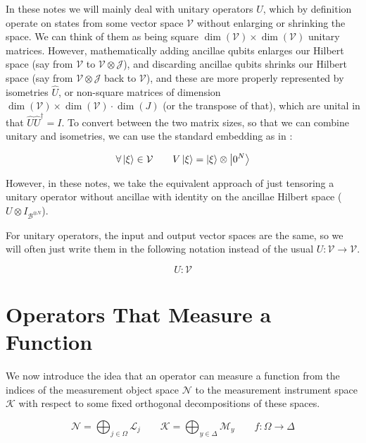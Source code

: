 In these notes we will mainly deal with unitary operators $U$, which by
definition operate on
states from some vector space $\mathcal{V}$
without enlarging or shrinking the space.
We can think of them as being square
$\dim(\mathcal{V}) \times \dim(\mathcal{V})$
unitary matrices.
However, mathematically adding ancillae qubits enlarges our Hilbert space
(say from $\mathcal{V}$ to $\mathcal{V}\otimes \mathcal{J}$),
and discarding ancillae qubits shrinks our Hilbert space
(say from $\mathcal{V}\otimes \mathcal{J}$ back to $\mathcal{V}$),
and these are more properly represented by isometries $\hat{U}$,
or non-square matrices
of dimension
$\dim(\mathcal{V})\times \dim(\mathcal{V})\cdot\dim(J)$
(or the transpose of that), which are unital in that
$\hat{U}\hat{U}^\dagger = I$. To convert between the two matrix sizes,
so that we can combine unitary and isometries, we can use the
standard embedding as in \cite{Kitaev2002}:

\begin{equation}
\forall \left\vert{\xi}\right\rangle \in \mathcal{V} \qquad V\left\vert{\xi}\right\rangle = \left\vert{\xi}\right\rangle \otimes \left\vert{0^N}\right\rangle
\end{equation}

However, in these notes, we take the equivalent approach of just
tensoring a unitary operator without ancillae with identity on the
ancillae Hilbert space ($U \otimes I_{\mathcal{B}^{\otimes N}}$).

For unitary operators, the input and output vector spaces are the same,
so we will often just write them in the following notation instead of
the usual $U: \mathcal{V} \rightarrow \mathcal{V}$.

\begin{equation}
U : \mathcal{V}
\end{equation}

\section{Operators That Measure a Function}
\label{sec:meas-func}

We now introduce the idea that an operator can measure a function
from the indices of the measurement object space $\mathcal{N}$
to the measurement instrument space $\mathcal{K}$ with respect to
some fixed orthogonal decompositions of these spaces.

\begin{equation}
\mathcal{N} = \bigoplus_{j \in \Omega} \mathcal{L}_j \qquad
\mathcal{K} = \bigoplus_{y \in \Delta} \mathcal{M}_y \qquad
f:\Omega \rightarrow \Delta
\end{equation}

